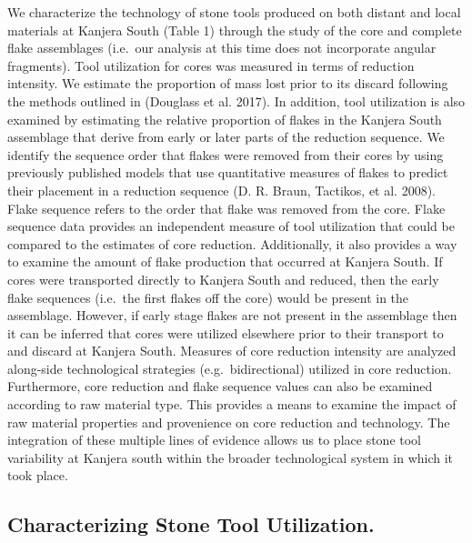 \documentclass[]{elsarticle} %
\begin{document}
We characterize the technology of stone tools produced on both distant
and local materials at Kanjera South (Table 1) through the study of the
core and complete flake assemblages (i.e.~our analysis at this time does
not incorporate angular fragments). Tool utilization for cores was
measured in terms of reduction intensity. We estimate the proportion of
mass lost prior to its discard following the methods outlined in
(Douglass et al. 2017). In addition, tool utilization is also examined
by estimating the relative proportion of flakes in the Kanjera South
assemblage that derive from early or later parts of the reduction
sequence. We identify the sequence order that flakes were removed from
their cores by using previously published models that use quantitative
measures of flakes to predict their placement in a reduction sequence
(D. R. Braun, Tactikos, et al. 2008). Flake sequence refers to the order
that flake was removed from the core. Flake sequence data provides an
independent measure of tool utilization that could be compared to the
estimates of core reduction. Additionally, it also provides a way to
examine the amount of flake production that occurred at Kanjera South.
If cores were transported directly to Kanjera South and reduced, then
the early flake sequences (i.e.~the first flakes off the core) would be
present in the assemblage. However, if early stage flakes are not
present in the assemblage then it can be inferred that cores were
utilized elsewhere prior to their transport to and discard at Kanjera
South. Measures of core reduction intensity are analyzed along-side
technological strategies (e.g.~bidirectional) utilized in core
reduction. Furthermore, core reduction and flake sequence values can
also be examined according to raw material type. This provides a means
to examine the impact of raw material properties and provenience on core
reduction and technology. The integration of these multiple lines of
evidence allows us to place stone tool variability at Kanjera south
within the broader technological system in which it took place.

\hypertarget{characterizing-stone-tool-utilization.}{%
\subsection{Characterizing Stone Tool
Utilization.}\label{characterizing-stone-tool-utilization.}}
\end{document}
